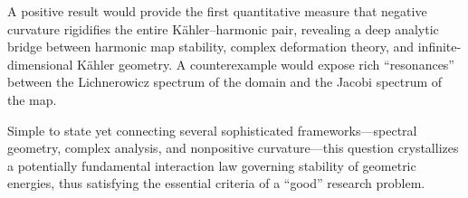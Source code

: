 A positive result would provide the first quantitative measure that negative curvature rigidifies the entire Kähler–harmonic pair, revealing a deep analytic bridge between harmonic map stability, complex deformation theory, and infinite-dimensional Kähler geometry. A counterexample would expose rich “resonances” between the Lichnerowicz spectrum of the domain and the Jacobi spectrum of the map.  

Simple to state yet connecting several sophisticated frameworks—spectral geometry, complex analysis, and nonpositive curvature—this question crystallizes a potentially fundamental interaction law governing stability of geometric energies, thus satisfying the essential criteria of a “good” research problem.